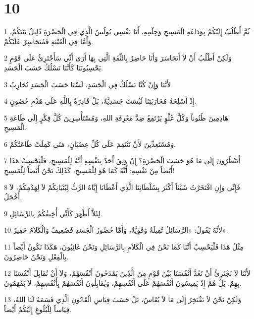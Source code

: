 \chapter{10}

\par 1 ثُمَّ أَطْلُبُ إِلَيْكُمْ بِوَدَاعَةِ الْمَسِيحِ وَحِلْمِهِ، أَنَا نَفْسِي بُولُسُ الَّذِي فِي الْحَضْرَةِ ذَلِيلٌ بَيْنَكُمْ، وَأَمَّا فِي الْغَيْبَةِ فَمُتَجَاسِرٌ عَلَيْكُمْ.
\par 2 وَلَكِنْ أَطْلُبُ أَنْ لاَ أَتَجَاسَرَ وَأَنَا حَاضِرٌ بِالثِّقَةِ الَّتِي بِهَا أَرَى أَنِّي سَأَجْتَرِئُ عَلَى قَوْمٍ يَحْسِبُونَنَا كَأَنَّنَا نَسْلُكُ حَسَبَ الْجَسَدِ.
\par 3 لأَنَّنَا وَإِنْ كُنَّا نَسْلُكُ فِي الْجَسَدِ، لَسْنَا حَسَبَ الْجَسَدِ نُحَارِبُ.
\par 4 إِذْ أَسْلِحَةُ مُحَارَبَتِنَا لَيْسَتْ جَسَدِيَّةً، بَلْ قَادِرَةٌ بِاللَّهِ عَلَى هَدْمِ حُصُونٍ.
\par 5 هَادِمِينَ ظُنُوناً وَكُلَّ عُلْوٍ يَرْتَفِعُ ضِدَّ مَعْرِفَةِ اللهِ، وَمُسْتَأْسِرِينَ كُلَّ فِكْرٍ إِلَى طَاعَةِ الْمَسِيحِ،
\par 6 وَمُسْتَعِدِّينَ لأَنْ نَنْتَقِمَ عَلَى كُلِّ عِصْيَانٍ، مَتَى كَمِلَتْ طَاعَتُكُمْ.
\par 7 أَتَنْظُرُونَ إِلَى مَا هُوَ حَسَبَ الْحَضْرَةِ؟ إِنْ وَثِقَ أَحَدٌ بِنَفْسِهِ أَنَّهُ لِلْمَسِيحِ، فَلْيَحْسِبْ هَذَا أَيْضاً مِنْ نَفْسِهِ: أَنَّهُ كَمَا هُوَ لِلْمَسِيحِ، كَذَلِكَ نَحْنُ أَيْضاً لِلْمَسِيحِ!
\par 8 فَإِنِّي وَإِنِ افْتَخَرْتُ شَيْئاً أَكْثَرَ بِسُلْطَانِنَا الَّذِي أَعْطَانَا إِيَّاهُ الرَّبُّ لِبُنْيَانِكُمْ لاَ لِهَدْمِكُمْ، لاَ أُخْجَلُ.
\par 9 لِئَلاَّ أَظْهَرَ كَأَنِّي أُخِيفُكُمْ بِالرَّسَائِلِ.
\par 10 لأَنَّهُ يَقُولُ: «الرَّسَائِلُ ثَقِيلَةٌ وَقَوِيَّةٌ، وَأَمَّا حُضُورُ الْجَسَدِ فَضَعِيفٌ وَالْكَلاَمُ حَقِيرٌ».
\par 11 مِثْلُ هَذَا فَلْيَحْسِبْ أَنَّنَا كَمَا نَحْنُ فِي الْكَلاَمِ بِالرَّسَائِلِ وَنَحْنُ غَائِبُونَ، هَكَذَا نَكُونُ أَيْضاً بِالْفِعْلِ وَنَحْنُ حَاضِرُونَ.
\par 12 لأَنَّنَا لاَ نَجْتَرِئُ أَنْ نَعُدَّ أَنْفُسَنَا بَيْنَ قَوْمٍ مِنَ الَّذِينَ يَمْدَحُونَ أَنْفُسَهُمْ، وَلاَ أَنْ نُقَابِلَ أَنْفُسَنَا بِهِمْ. بَلْ هُمْ إِذْ يَقِيسُونَ أَنْفُسَهُمْ عَلَى أَنْفُسِهِمْ، وَيُقَابِلُونَ أَنْفُسَهُمْ بِأَنْفُسِهِمْ، لاَ يَفْهَمُونَ.
\par 13 وَلَكِنْ نَحْنُ لاَ نَفْتَخِرُ إِلَى مَا لاَ يُقَاسُ، بَلْ حَسَبَ قِيَاسِ الْقَانُونِ الَّذِي قَسَمَهُ لَنَا اللهُ، قِيَاساً لِلْبُلُوغِ إِلَيْكُمْ أَيْضاً.
